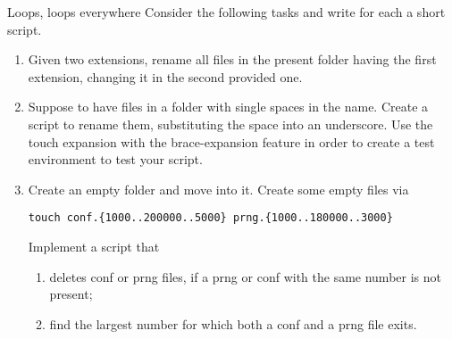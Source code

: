 
\begin{exercise}[DodgerBlue]{Loops, loops everywhere}
    Consider the following tasks and write for each a short script.
    \begin{enumerate}[after=\vspace{-0.6\baselineskip}]
        \item Given two extensions, rename all files in the present folder having the first extension, changing it in the second provided one.
        \item Suppose to have files in a folder with single spaces in the name. Create a script to rename them, substituting the space into an underscore.
              Use the touch expansion with the brace-expansion feature in order to create a test environment to test your script.
        \item Create an empty folder and move into it.
              Create some empty files via
              \begin{lstlisting}[style=MyBash, numbers=none]
                  touch conf.{1000..200000..5000} prng.{1000..180000..3000}
              \end{lstlisting}
              Implement a script that
              \begin{enumerate}[after=\vspace{-0.6\baselineskip}]
                  \item deletes conf or prng files, if a prng or conf with the same number is not present;
                  \item find the largest number for which both a conf and a prng file exits.
              \end{enumerate}
    \end{enumerate}
\end{exercise}
